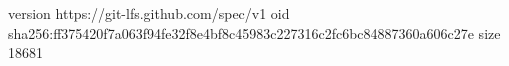 version https://git-lfs.github.com/spec/v1
oid sha256:ff375420f7a063f94fe32f8e4bf8c45983c227316c2fc6bc84887360a606c27e
size 18681
